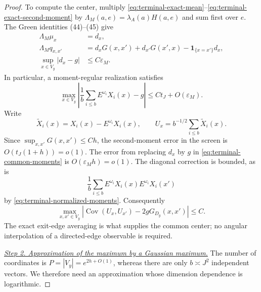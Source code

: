 \begin{proof}
To compute the center, multiply
\eqref{eq:terminal-exact-mean}--\eqref{eq:terminal-exact-second-moment}
by $\Lambda_M(a,e)=\lambda_A(a)H(a,e)$ and sum first over $e$.
The Green identities (44)--(45) give
\begin{equation}
 \begin{split}
 \Lambda_M\mu_x&=d_x,\\
 \Lambda_Mq_{x,x'}
 &=d_xG(x,x')+d_{x'}G(x',x)-\mathbf1_{\{x=x'\}}d_x,\\
 \sup_{x\in V_y}|d_x-g|&\le C\varepsilon_M.
 \end{split}
 \tag{L4}\label{eq:terminal-common-moments}
\end{equation}
In particular, a moment-regular realization satisfies
\begin{equation}
 \max_{x\in V_y}
 \left|\frac1b\sum_{i\le b}E^{\omega_i}X_i(x)-g\right|
 \le Ct_J+O(\varepsilon_M).
 \tag{70}\label{eq:terminal-conditional-mean}
\end{equation}
Write
\[
 \widetilde X_i(x)=X_i(x)-E^{\omega_i}X_i(x),\qquad
 U_x=b^{-1/2}\sum_{i\le b}\widetilde X_i(x).
\]
Since $\sup_{x,x'}G(x,x')\le Ch$, the second-moment error in the
screen is $O(t_J(1+h))=o(1)$.  The error from replacing $d_x$ by $g$
in \eqref{eq:terminal-common-moments} is $O(\varepsilon_Mh)=o(1)$.
The diagonal correction is bounded, as is
\[
 \frac1b\sum_{i\le b}
 E^{\omega_i}X_i(x)E^{\omega_i}X_i(x')
\]
by \eqref{eq:terminal-normalized-moments}.  Consequently
\begin{equation}
 \max_{x,x'\in V_y}
 \left|\operatorname{Cov}(U_x,U_{x'})-2gG_{D_y}(x,x')\right|
 \le C.
 \tag{74}\label{eq:terminal-covariance-comparison}
\end{equation}
The exact exit-edge averaging is what supplies the common center;
no angular interpolation of a directed-edge observable is required.

\smallskip\noindent
\underline{\textit{Step 2. Approximation of the maximum by a Gaussian maximum.}}
The number of coordinates is $P=|V_y|=e^{2h+O(1)}$, whereas there
are only $b\asymp J^2$ independent vectors.  We therefore need an
approximation whose dimension dependence is logarithmic.


\end{proof}
